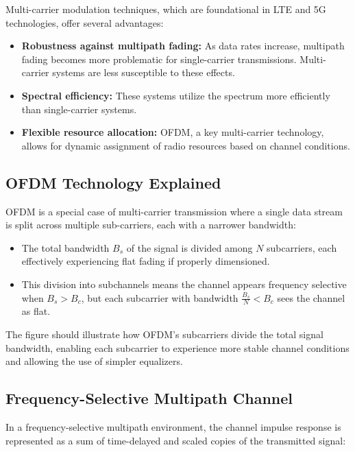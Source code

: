 Multi-carrier modulation techniques, which are foundational in LTE and 5G technologies, offer several advantages:

\begin{itemize}
    \item \textbf{Robustness against multipath fading:} As data rates increase, multipath fading becomes more problematic for single-carrier transmissions. Multi-carrier systems are less susceptible to these effects.
    \item \textbf{Spectral efficiency:} These systems utilize the spectrum more efficiently than single-carrier systems.
    \item \textbf{Flexible resource allocation:} OFDM, a key multi-carrier technology, allows for dynamic assignment of radio resources based on channel conditions.
\end{itemize}

\subsection*{OFDM Technology Explained}

OFDM is a special case of multi-carrier transmission where a single data stream is split across multiple sub-carriers, each with a narrower bandwidth:

\begin{itemize}
    \item The total bandwidth \( B_s \) of the signal is divided among \( N \) subcarriers, each effectively experiencing flat fading if properly dimensioned.
    \item This division into subchannels means the channel appears frequency selective when \( B_s > B_c \), but each subcarrier with bandwidth \( \frac{B_s}{N} < B_c \) sees the channel as flat.
\end{itemize}

The figure should illustrate how OFDM's subcarriers divide the total signal bandwidth, enabling each subcarrier to experience more stable channel conditions and allowing the use of simpler equalizers.

\subsection*{Frequency-Selective Multipath Channel}

In a frequency-selective multipath environment, the channel impulse response is represented as a sum of time-delayed and scaled copies of the transmitted signal:

